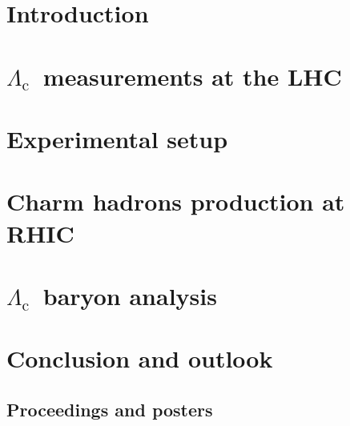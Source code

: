 \documentclass[a4paper,titlepage,11pt]{book} %
\newcommand{\Listofabbrev}{
                           \printnomenclature
                           \newpage
                          }
\newcommand{\Lambdac}{\ensuremath{\Lambda_\text{c}}}
\begin{document}
\thispagestyle{fancy}
\renewcommand{\footrulewidth}{0.4pt}


% 


\newpage
% 

\tableofcontents 
\pagestyle{fancy}
\fancyhead{} %
\fancyhead[RE]{\rightmark}
\fancyhead[LO]{\leftmark}

\renewcommand{\footrulewidth}{0.4pt}
\chapter{Introduction}
\setcounter{page}{1}




\chapter{\Lambdac\ measurements at the LHC\label{LcLHC}}


\chapter{Experimental setup\label{experiment}}


\chapter{Charm hadrons production at RHIC\label{cQuarkRHIC}}


\chapter{\Lambdac\ baryon analysis\label{analysis}}


\chapter{Conclusion and outlook} \label{conclusion}



 \cleardoublepage

\Listofabbrev \newpage

\cleardoublepage


\begin{appendices}
\chapter{Proceedings and posters}

\end{appendices}
\end{document}
